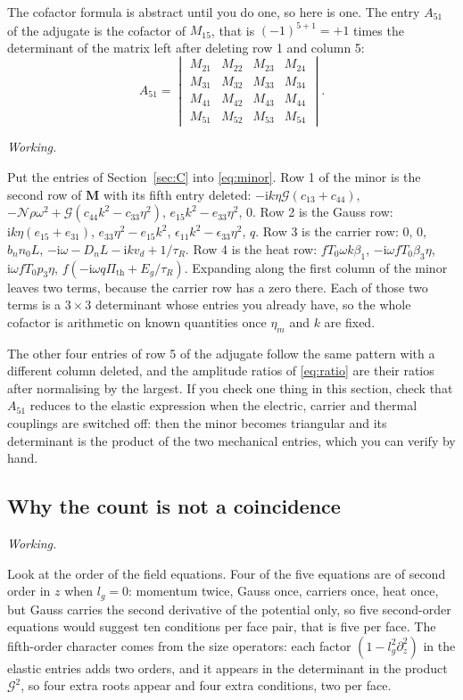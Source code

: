 \documentclass[11pt,a4paper]{article}
\newif\ifshowworked \showworkedtrue
\newenvironment{worked}{\ifshowworked\par\smallskip\noindent\textit{Working.}\par\else\setbox0\vbox\bgroup\fi}{\ifshowworked\par\smallskip\else\egroup\fi}
\newcommand{\Nc}{\mathcal{N}}
\newcommand{\Gc}{\mathcal{G}}
\newcommand{\Pth}{\Pi_{\mathrm{th}}}
\newcommand{\ii}{\mathrm{i}}
\begin{document}
The cofactor formula is abstract until you do one, so here is one. The entry $A_{51}$ of the adjugate is the
cofactor of $M_{15}$, that is $(-1)^{5+1}=+1$ times the determinant of the matrix left after deleting row 1
and column 5:
\begin{equation}\label{eq:minor}
A_{51}=\begin{vmatrix}
M_{21}&M_{22}&M_{23}&M_{24}\\
M_{31}&M_{32}&M_{33}&M_{34}\\
M_{41}&M_{42}&M_{43}&M_{44}\\
M_{51}&M_{52}&M_{53}&M_{54}
\end{vmatrix}.
\end{equation}

\begin{worked}
Put the entries of Section~\ref{sec:C} into \eqref{eq:minor}. Row 1 of the minor is the second row of
$\mathbf M$ with its fifth entry deleted: $-\ii k\eta\Gc(c_{13}+c_{44})$, $-\Nc\rho\omega^2+\Gc(c_{44}k^2-c_{33}\eta^2)$,
$e_{15}k^2-e_{33}\eta^2$, $0$. Row 2 is the Gauss row: $\ii k\eta(e_{15}+e_{31})$, $e_{33}\eta^2-e_{15}k^2$,
$\epsilon_{11}k^2-\epsilon_{33}\eta^2$, $q$. Row 3 is the carrier row: $0$, $0$, $b_nn_0L$,
$-\ii\omega-D_nL-\ii kv_d+1/\tau_R$. Row 4 is the heat row: $fT_0\omega k\beta_1$,
$-\ii\omega fT_0\beta_3\eta$, $\ii\omega fT_0p_3\eta$, $f(-\ii\omega q\Pth+E_g/\tau_R)$. Expanding along the
first column of the minor leaves two terms, because the carrier row has a zero there. Each of those two
terms is a $3\times3$ determinant whose entries you already have, so the whole cofactor is arithmetic on
known quantities once $\eta_m$ and $k$ are fixed.
\end{worked}

\noindent The other four entries of row 5 of the adjugate follow the same pattern with a different column
deleted, and the amplitude ratios of \eqref{eq:ratio} are their ratios after normalising by the largest. If
you check one thing in this section, check that $A_{51}$ reduces to the elastic expression when the electric,
carrier and thermal couplings are switched off: then the minor becomes triangular and its determinant is the
product of the two mechanical entries, which you can verify by hand.

\subsection{Why the count is not a coincidence}

\begin{worked}
Look at the order of the field equations. Four of the five equations are of second order in $z$ when
$l_g=0$: momentum twice, Gauss once, carriers once, heat once, but Gauss carries the second derivative of
the potential only, so five second-order equations would suggest ten conditions per face pair, that is
five per face. The fifth-order character comes from the size operators: each factor
$(1-l_g^2\partial_z^2)$ in the elastic entries adds two orders, and it appears in the determinant in the
product $\Gc^2$, so four extra roots appear and four extra conditions, two per face.
\end{worked}
\end{document}
